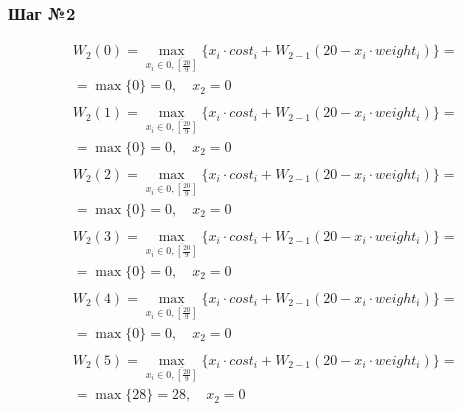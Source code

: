 \documentclass[17pt]{extarticle}
\begin{document}
\subsubsection*{Шаг №2}
\[
    \begin{aligned}
         & W_2(0)=\max_{x_i \in \overline{0, \left[\frac{20}{9}\right]}} \{x_i \cdot cost_i + W_{2-1}(20 - x_i \cdot weight_i)\}= \\& = \max \{
        0\}= 0, \quad x_2 = 0                                                                                                     \\
    \end{aligned}
\]
\[
    \begin{aligned}
         & W_2(1)=\max_{x_i \in \overline{0, \left[\frac{20}{9}\right]}} \{x_i \cdot cost_i + W_{2-1}(20 - x_i \cdot weight_i)\}= \\& = \max \{
        0\}= 0, \quad x_2 = 0                                                                                                     \\
    \end{aligned}
\]
\[
    \begin{aligned}
         & W_2(2)=\max_{x_i \in \overline{0, \left[\frac{20}{9}\right]}} \{x_i \cdot cost_i + W_{2-1}(20 - x_i \cdot weight_i)\}= \\& = \max \{
        0\}= 0, \quad x_2 = 0                                                                                                     \\
    \end{aligned}
\]
\[
    \begin{aligned}
         & W_2(3)=\max_{x_i \in \overline{0, \left[\frac{20}{9}\right]}} \{x_i \cdot cost_i + W_{2-1}(20 - x_i \cdot weight_i)\}= \\& = \max \{
        0\}= 0, \quad x_2 = 0                                                                                                     \\
    \end{aligned}
\]
\[
    \begin{aligned}
         & W_2(4)=\max_{x_i \in \overline{0, \left[\frac{20}{9}\right]}} \{x_i \cdot cost_i + W_{2-1}(20 - x_i \cdot weight_i)\}= \\& = \max \{
        0\}= 0, \quad x_2 = 0                                                                                                     \\
    \end{aligned}
\]
\[
    \begin{aligned}
         & W_2(5)=\max_{x_i \in \overline{0, \left[\frac{20}{9}\right]}} \{x_i \cdot cost_i + W_{2-1}(20 - x_i \cdot weight_i)\}= \\& = \max \{
        28\}= 28, \quad x_2 = 0                                                                                                   \\
    \end{aligned}
\]
\end{document}
